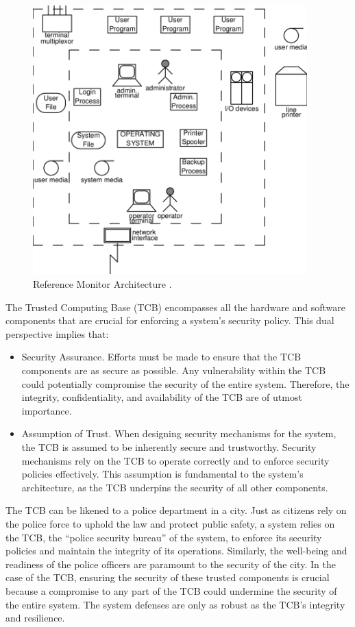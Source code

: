 \begin{figure}[htbp]
	\centering
	\includegraphics[width=300pt]{chapters/ch-computer-security-basics/figures/system_boundary.png}
	\caption{Reference Monitor Architecture \cite{gasser1988building}.} \label{ch:ossec:fig:system_boundary}
\end{figure}

The Trusted Computing Base (TCB) encompasses all the hardware and software components that are crucial for enforcing a system's security policy. This dual perspective implies that:

\begin{itemize}
	\item Security Assurance. Efforts must be made to ensure that the TCB components are as secure as possible. Any vulnerability within the TCB could potentially compromise the security of the entire system. Therefore, the integrity, confidentiality, and availability of the TCB are of utmost importance.
	\item Assumption of Trust. When designing security mechanisms for the system, the TCB is assumed to be inherently secure and trustworthy. Security mechanisms rely on the TCB to operate correctly and to enforce security policies effectively. This assumption is fundamental to the system's architecture, as the TCB underpins the security of all other components.
\end{itemize}

The TCB can be likened to a police department in a city. Just as citizens rely on the police force to uphold the law and protect public safety, a system relies on the TCB, the ``police security bureau'' of the system, to enforce its security policies and maintain the integrity of its operations. Similarly, the well-being and readiness of the police officers are paramount to the security of the city. In the case of the TCB, ensuring the security of these trusted components is crucial because a compromise to any part of the TCB could undermine the security of the entire system. The system defenses are only as robust as the TCB's integrity and resilience.

